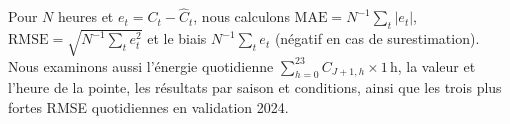 Pour $N$ heures et $e_t=C_t-\widehat C_t$, nous calculons $\mathrm{MAE}=N^{-1}\sum_t|e_t|$, $\mathrm{RMSE}=\sqrt{N^{-1}\sum_t e_t^2}$ et le biais $N^{-1}\sum_t e_t$ (négatif en cas de surestimation). Nous examinons aussi l'énergie quotidienne $\sum_{h=0}^{23}C_{J+1,h}\times1\,\mathrm{h}$, la valeur et l'heure de la pointe, les résultats par saison et conditions, ainsi que les trois plus fortes RMSE quotidiennes en validation 2024. 
